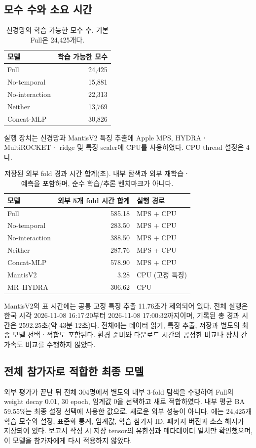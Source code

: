 \documentclass[11pt,a4paper]{article}
\newcommand{\code}[1]{\texttt{\detokenize{#1}}}
\numberwithin{equation}{section}
\begin{document}
\subsection{모수 수와 소요 시간}
\begin{table}[H]\centering\small
\caption{신경망의 학습 가능한 모수 수. 기본 Full은 24,425개다.}
\begin{tabular}{@{}lr@{}}\toprule 모델 & 학습 가능한 모수\\\midrule
Full & 24,425 \\
No-temporal & 15,881 \\
No-interaction & 22,313 \\
Neither & 13,769 \\
Concat-MLP & 30,826 \\
\bottomrule\end{tabular}
\end{table}
실행 장치는 신경망과 MantisV2 특징 추출에 Apple MPS, HYDRAㆍMultiROCKETㆍ
ridge 및 특징 scaler에 CPU를 사용하였다. CPU thread 설정은 4다.
\begin{table}[H]\centering\small
\caption{저장된 외부 fold 경과 시간 합계(초). 내부 탐색과 외부 재학습ㆍ예측을
포함하며, 순수 학습/추론 벤치마크가 아니다.}
\begin{tabular}{@{}lrl@{}}\toprule 모델 & 외부 5개 fold 시간 합계 & 실행 경로\\\midrule
Full & 585.18 & MPS + CPU \\
No-temporal & 283.50 & MPS + CPU \\
No-interaction & 388.50 & MPS + CPU \\
Neither & 287.76 & MPS + CPU \\
Concat-MLP & 578.90 & MPS + CPU \\
MantisV2 & 3.28 & CPU (고정 특징) \\
MR--HYDRA & 306.62 & CPU \\
\bottomrule\end{tabular}\label{tab:runtime}
\end{table}
MantisV2의 표 시간에는 공통 고정 특징 추출 11.76초가 제외되어 있다.
전체 실행은 한국 시각 2026-11-08 16:17:20부터 2026-11-08 17:00:32까지이며,
기록된 총 경과 시간은 2592.25초(약 43분 12초)다.
전체에는 데이터 읽기, 특징 추출, 저장과 별도의 최종 모델 선택ㆍ적합도 포함된다.
환경 준비와 다운로드 시간의 공정한 비교나 장치 간 가속도 비교를 수행하지 않았다.

\subsection{전체 참가자로 적합한 최종 모델}
외부 평가가 끝난 뒤 전체 304명에서 별도의 내부 3-fold 탐색을 수행하여
Full의 weight decay 0.01, 30 epoch, 임계값 0을 선택하고 새로 적합하였다.
내부 평균 BA 59.55\%는 최종 설정 선택에 사용한 값으로, 새로운 외부 성능이 아니다.
\code{final_model.pt}에는 24,425개 학습 모수와 설정, 표준화 통계, 임계값,
학습 참가자 ID, 패키지 버전과 소스 해시가 저장되어 있다.
보고서 작성 시 저장 tensor의 유한성과 메타데이터 일치만 확인했으며,
이 모델을 참가자에게 다시 적용하지 않았다.
\end{document}
